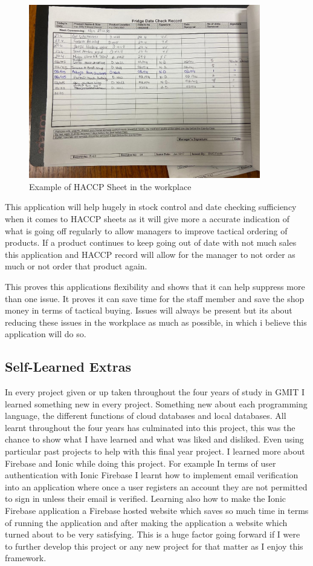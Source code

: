 \begin{figure}[h!]
	\caption{Example of HACCP Sheet in the workplace}
	\label{image:HACCP}
	\centering
	\includegraphics[width=0.9\textwidth]{images/HACCP.jpg}
\end{figure}

This application will help hugely in stock control and date checking sufficiency when it comes to HACCP sheets as it will give more a accurate indication of what is going off regularly to allow managers to improve tactical ordering of products. If a product continues to keep going out of date with not much sales this application and HACCP record will allow for the manager to not order as much or not order that product again.
\newline

This proves this applications flexibility and shows that it can help suppress more than one issue. It proves it can save time for the staff member and save the shop money in terms of tactical buying. Issues will always be present but its about reducing these issues in the workplace as much as possible, in which i believe this application will do so. 


\subsection{Self-Learned Extras}
In every project given or up taken throughout the four years of study in GMIT I learned something new in every project. Something new about each programming language, the different functions of cloud databases and local databases. All learnt throughout the four years has culminated into this project, this was the chance to show what I have learned and what was liked and disliked. Even using particular past projects to help with this final year project. I learned more about Firebase and Ionic while doing this project. For example In terms of user authentication with Ionic Firebase I learnt how to implement email verification into an application where once a user registers an account they are not permitted to sign in unless their email is verified. Learning also how to make the Ionic Firebase application a Firebase hosted website which saves so much time in terms of running the application and after making the application a website which turned about to be very satisfying. This is a huge factor going forward if I were to further develop this project or any new project for that matter as I enjoy this framework. 

